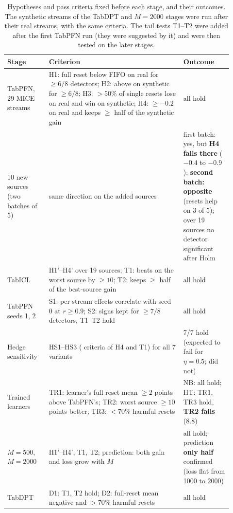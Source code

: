 \begin{table}[h]
\centering
\caption{Hypotheses and pass criteria fixed before each stage, and their outcomes. The synthetic streams of
the TabDPT and $M=2000$ stages were run after their real streams, with the same criteria. The tail tests T1--T2 were added after the
first TabPFN run (they were suggested by it) and were then tested on the later stages.}
\label{tab:prereg}
\small
\begin{tabular}{p{0.17\linewidth}p{0.55\linewidth}p{0.20\linewidth}}
\toprule
Stage & Criterion & Outcome \\
\midrule
TabPFN, 29 MICE streams & H1: full reset below FIFO on real for $\ge6/8$ detectors; H2: above on synthetic for
$\ge6/8$; H3: $>50\%$ of single resets lose on real and win on synthetic; H4: \hedge{} $\ge-0.2$ on real and keeps
$\ge$ half of the synthetic gain & all hold \\
10 new sources (two batches of 5) & same direction on the added sources & first batch: yes, but \textbf{H4 fails there} (\hedge{} $-0.4$ to $-0.9$); \textbf{second batch: opposite} (resets help on 3 of 5);
over 19 sources no detector significant after Holm \\
TabICL & H1'--H4' over 19 sources; T1: \hedge{} beats \full{} on the worst source by $\ge10$; T2: \hedge{} keeps
$\ge$ half of the best-source gain & all hold \\
TabPFN seeds 1, 2 & S1: per-stream effects correlate with seed 0 at $r\ge0.9$; S2: signs kept for $\ge7/8$
detectors, T1--T2 hold & all hold \\
Hedge sensitivity & HS1--HS3 (\hedge{} criteria of H4 and T1) for all 7 variants & 7/7 hold (expected to fail
for $\eta=0.5$; did not) \\
Trained learners & TR1: learner's full-reset mean $\ge2$ points above TabPFN's; TR2: worst source $\ge10$ points
better; TR3: $<70\%$ harmful resets & NB: all hold; HT: TR1, TR3 hold, \textbf{TR2 fails} (8.8) \\
$M=500$, $M=2000$ & H1'--H4', T1, T2; prediction: both gain and loss grow with $M$ & all hold; prediction
\textbf{only half} confirmed (loss flat from 1000 to 2000) \\
TabDPT & D1: T1, T2 hold; D2: full-reset mean negative and $>70\%$ harmful resets & all hold \\
\bottomrule
\end{tabular}
\end{table}
